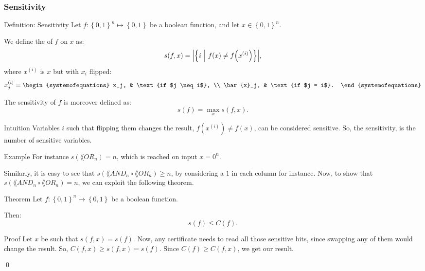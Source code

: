 \documentclass[a4paper]{article}
\begin{document}
\subsubsection{Sensitivity}

\begin{parag}{Definition: Sensitivity}
    Let $f: \left\{0, 1\right\}^n \mapsto \left\{0, 1\right\}$ be a boolean function, and let $x \in \left\{0, 1\right\}^n$.

    We define the  of $f$ on $x$ as: 
    \[s\left(f, x\right) = \left|\left\{i \suchthat f\left(x\right) \neq f\left(x^{\left(i\right)}\right)\right\}\right|,\]
    where $x^{\left(i\right)}$ is $x$ but with $x_i$ flipped: 
    \[x^{\left(i\right)}_j = \begin{systemofequations} x_j, & \text{if $j \neq i$}, \\ \bar{x}_j, & \text{if $j = i$}. \end{systemofequations}\]

    The sensitivity of $f$ is moreover defined as: 
    \[s\left(f\right) = \max_x s\left(f, x\right).\]

    \begin{subparag}{Intuition}
        Variables $i$ such that flipping them changes the result, $f\left(x^{\left(i\right)}\right) \neq f\left(x\right)$, can be considered sensitive. So, the sensitivity, is the number of sensitive variables.
    \end{subparag}

    \begin{subparag}{Example}
        For instance $s\left(\lang{OR}_n\right) = n$, which is reached on input $x = 0^n$.

        Similarly, it is easy to see that $s\left(\lang{AND}_n \circ \lang{OR}_n\right) \geq n$, by considering a $1$ in each column for instance. Now, to show that $s\left(\lang{AND}_n \circ \lang{OR}_n\right) = n$, we can exploit the following theorem.
    \end{subparag}
\end{parag}

\begin{parag}{Theorem}
    Let $f: \left\{0, 1\right\}^n \mapsto \left\{0, 1\right\}$ be a boolean function.

    Then: 
    \[s\left(f\right) \leq C\left(f\right).\]
    
    \begin{subparag}{Proof}
        Let $x$ be such that $s\left(f, x\right) = s\left(f\right)$. Now, any certificate needs to read all those sensitive bits, since swapping any of them would change the result. So, $C\left(f, x\right) \geq s\left(f, x\right) = s\left(f\right)$. Since $C\left(f\right) \geq C\left(f, x\right)$, we get our result.

        \qed
    \end{subparag}
\end{parag}
\end{document}
